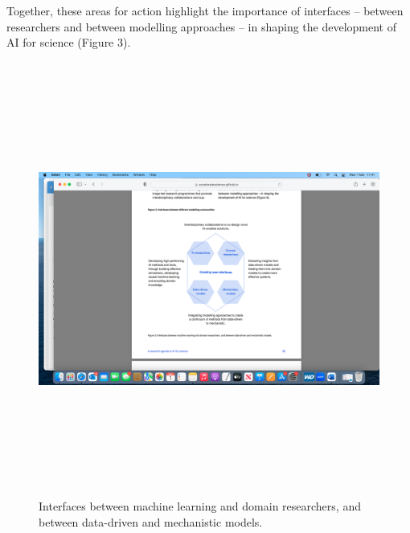 Together, these areas for action highlight the importance of interfaces
-- between researchers and between modelling approaches -- in shaping
the development of AI for science (Figure 3).

\begin{figure}
\includegraphics[width=5.98951in,height=5.6132in]{media/image3.png}
\caption{Interfaces between machine learning and domain researchers, and between data-driven and mechanistic models.}
\end{figure}
